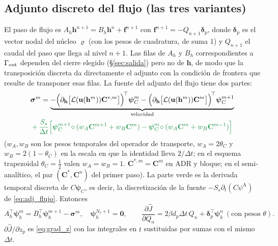 \documentclass[11pt]{article}
\numberwithin{equation}{section}
\theoremstyle{plain}
\theoremstyle{definition}
\theoremstyle{remark}
\newcommand{\bu}{\mathbf{u}}
\newcommand{\Nuc}{\varrho}                      %
\newcommand{\pA}{\psi^{\mathrm A}}          %
\newcommand{\alm}[1]{{\color{cAlm}#1}}
\begin{document}
\subsection{Adjunto discreto del flujo (las tres variantes)}
El paso de flujo es $A_h\mathbf{h}^{n+1}=B_h\mathbf{h}^n+\mathbf{f}^{n+1}$ con $\mathbf{f}^{n+1}=-Q_{n+1}\boldsymbol\delta_p$, donde $\boldsymbol\delta_p$ es el vector nodal del núcleo $\Nuc$ (con los pesos de cuadratura, de suma $1$) y
$Q_{n+1}$ el caudal del paso que llega al nivel $n+1$. Las filas de $A_h$ y $B_h$ correspondientes a $\Gamma_{\rm out}$ dependen del cierre elegido (\S\ref{sec:salida}) pero no de $\mathbf{h}$, de modo que la transposición discreta
da directamente el adjunto con la condición de frontera que resulte de transponer esas filas. La fuente del adjunto del flujo tiene dos partes:
\begin{multline}
\boldsymbol\sigma^{m}=\underbrace{-\Bigl(\partial_{\mathbf{h}}\bigl[\mathcal{L}(\bu(\mathbf{h}^m))\mathbf{C}^{*,m}\bigr]\Bigr)^{\!\top}\boldsymbol\psi_C^{m}
-\Bigl(\partial_{\mathbf{h}}\bigl[\mathcal{L}(\bu(\mathbf{h}^m))\mathbf{C}^{m}\bigr]\Bigr)^{\!\top}\boldsymbol\psi_C^{m+1}}_{\text{velocidad}}\\
\alm{+\,\frac{S_s}{\Delta t}\Bigl[\boldsymbol\psi_C^{m+1}\!\circ(w_A\mathbf{C}^{m+1}+w_B\mathbf{C}^m)-\boldsymbol\psi_C^{m}\!\circ(w_A\mathbf{C}^{m}+w_B\mathbf{C}^{m-1})\Bigr]}
\end{multline}
($w_A,w_B$ son los pesos temporales del operador de transporte, $w_A=2\theta_C$ y $w_B=2(1-\theta_C)$ en la escala en que la
identidad lleva $2/\Delta t$; en el esquema trapezoidal $\theta_C=\tfrac12$ valen $w_A=w_B=1$. $\mathbf{C}^{*,m}=\mathbf{C}^m$ en ADR y bloque; en el semi-analítico, el par $(\mathbf{C}^*,\mathbf{C}^n)$ del primer
paso). La parte verde es la derivada temporal discreta de $C\boldsymbol\psi_C$, es decir, la discretización de la fuente
$-S_s\partial_t(C\pA)$ de \eqref{eq:adj_flujo}. Entonces
\begin{equation}
A_h^\top\boldsymbol\psi_h^{m}=B_h^\top\boldsymbol\psi_h^{m+1}-\boldsymbol\sigma^{m},
\quad\boldsymbol\psi_h^{N_t+1}=\mathbf{0},
\qquad
\frac{\partial\hat J}{\partial Q_n}=2\beta d_p\Delta t\,Q_n+\boldsymbol\delta_p^\top\boldsymbol\psi_h^{n}
\ (\text{con pesos }\theta).
\label{eq:disc_flujo}
\end{equation}
$\partial\hat J/\partial z_p$ es \eqref{eq:grad_z} con las integrales en $t$ sustituidas por sumas con el mismo $\Delta t$.
\end{document}
